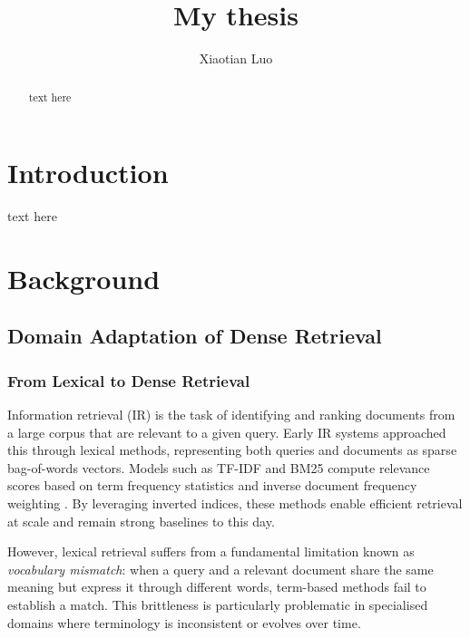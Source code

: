 \documentclass[thesis]{cluu}
\begin{document}
\title{My thesis}
\author{Xiaotian Luo}

\maketitle

\begin{abstract}
    text here
\end{abstract}

\tableofcontents


\chapter{Introduction}
text here

\chapter{Background}
\section{Domain Adaptation of Dense Retrieval}
\subsection{From Lexical to Dense Retrieval}

Information retrieval (IR) is the task of identifying and ranking 
documents from a large corpus that are relevant to a given query. 
Early IR systems approached this through lexical methods, representing 
both queries and documents as sparse bag-of-words vectors. Models such 
as TF-IDF and BM25 compute relevance scores based on term frequency 
statistics and inverse document frequency weighting 
\parencite{manning2008introduction, robertson2009probabilistic}. By 
leveraging inverted indices, these methods enable efficient retrieval 
at scale and remain strong baselines to this day.

However, lexical retrieval suffers from a fundamental limitation known 
as \textit{vocabulary mismatch}: when a query and a relevant document 
share the same meaning but express it through different words, 
term-based methods fail to establish a match. This brittleness is 
particularly problematic in specialised domains where terminology is 
inconsistent or evolves over time.
\end{document}

